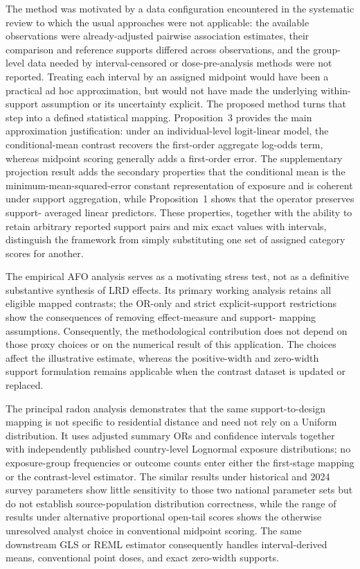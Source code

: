 \documentclass[journal=rsm]{CUP-JNL-DTM}%
\theoremstyle{definition}
\numberwithin{equation}{section}
\begin{document}
The method was motivated by a data configuration encountered in the systematic
review to which the usual approaches were not applicable: the
available observations were already-adjusted pairwise association estimates,
their comparison and reference supports differed across observations, and the
group-level data needed by interval-censored or dose-pre-analysis methods were
not reported. Treating each interval by an assigned midpoint would have been a
practical ad hoc approximation, but would not have made the underlying
within-support assumption or its uncertainty explicit. The proposed method
turns that step into a defined statistical mapping. Proposition~3 provides the
main approximation justification: under an individual-level logit-linear model,
the conditional-mean contrast recovers the first-order aggregate log-odds term,
whereas midpoint scoring generally adds a first-order error. The supplementary
projection result adds the secondary properties that the conditional mean is
the minimum-mean-squared-error constant representation of exposure and is
coherent under support aggregation, while Proposition~1 shows that the operator preserves support-
averaged linear predictors. These properties, together with
the ability to retain arbitrary reported support pairs and mix exact values
with intervals, distinguish the framework from simply substituting one set of
assigned category scores for another.

The empirical AFO analysis serves as a motivating stress test, not as a
definitive substantive synthesis of LRD effects. Its primary working analysis
retains all eligible mapped contrasts; the OR-only and strict explicit-support
restrictions show the consequences of removing effect-measure and support-
mapping assumptions. Consequently, the methodological contribution does not
depend on those proxy choices or on the numerical result of this application.
The choices affect the illustrative estimate, whereas the positive-width and
zero-width support formulation remains applicable when the contrast dataset is
updated or replaced.

The principal radon analysis demonstrates that the same support-to-design
mapping is not specific to residential distance and need not rely on a Uniform
distribution. It uses adjusted summary ORs and confidence intervals together
with independently published country-level Lognormal exposure distributions;
no exposure-group frequencies or outcome counts enter either the first-stage
mapping or the contrast-level estimator. The similar results under historical
and 2024 survey parameters show little sensitivity to those two national
parameter sets but do not establish source-population distribution correctness,
while the range
of results under alternative proportional open-tail scores shows the otherwise
unresolved analyst choice in conventional midpoint scoring. The same
downstream GLS or REML estimator consequently handles interval-derived means,
conventional point doses, and exact zero-width supports.
\end{document}
